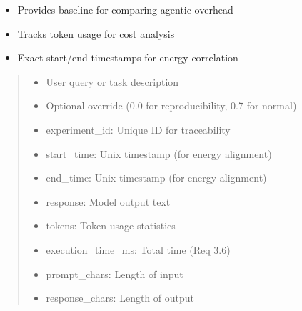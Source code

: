\documentclass[letterpaper,10pt,english]{sphinxmanual}
\begin{document}
\begin{fulllineitems}
\begin{fulllineitems}
\begin{description}
\begin{itemize}
\item {} 
\sphinxAtStartPar
Provides baseline for comparing agentic overhead

\item {} 
\sphinxAtStartPar
Tracks token usage for cost analysis

\item {} 
\sphinxAtStartPar
Exact start/end timestamps for energy correlation

\end{itemize}

\end{description}
\begin{quote}\begin{description}
\begin{itemize}
\item {} 
\sphinxAtStartPar
{} \textendash{} User query or task description

\item {} 
\sphinxAtStartPar
{} \textendash{} Optional override (0.0 for reproducibility, 0.7 for normal)

\end{itemize}

\sphinxAtStartPar
\begin{itemize}
\item {} 
\sphinxAtStartPar
experiment\_id: Unique ID for traceability

\item {} 
\sphinxAtStartPar
start\_time: Unix timestamp (for energy alignment)

\item {} 
\sphinxAtStartPar
end\_time: Unix timestamp (for energy alignment)

\item {} 
\sphinxAtStartPar
response: Model output text

\item {} 
\sphinxAtStartPar
tokens: Token usage statistics

\item {} 
\sphinxAtStartPar
execution\_time\_ms: Total time (Req 3.6)

\item {} 
\sphinxAtStartPar
prompt\_chars: Length of input

\item {} 
\sphinxAtStartPar
response\_chars: Length of output


\end{itemize}
\end{description}
\end{quote}
\end{fulllineitems}
\end{fulllineitems}
\end{document}
